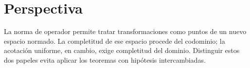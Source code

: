 \section{Perspectiva}
La norma de operador permite tratar transformaciones como puntos de un nuevo espacio normado. La completitud de ese espacio procede del codominio; la acotación uniforme, en cambio, exige completitud del dominio. Distinguir estos dos papeles evita aplicar los teoremas con hipótesis intercambiadas.
